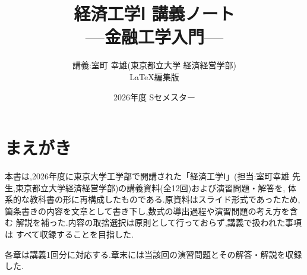 \documentclass[a4paper,11pt,book]{jlreq}
\title{\Huge 経済工学Ⅰ 講義ノート\\[1ex]\Large ---金融工学入門---}
\author{講義:室町 幸雄(東京都立大学 経済経営学部)\\LaTeX編集版}
\date{2026年度 Sセメスター}
\theoremstyle{boxedheadstyle}
\theoremstyle{asideheadstyle}
\begin{document}
\frontmatter
\maketitle

\chapter*{まえがき}
本書は,2026年度に東京大学工学部で開講された「経済工学Ⅰ」(担当:室町幸雄
先生,東京都立大学経済経営学部)の講義資料(全12回)および演習問題・解答を,
体系的な教科書の形に再構成したものである.原資料はスライド形式であったため,
箇条書きの内容を文章として書き下し,数式の導出過程や演習問題の考え方を含む
解説を補った.内容の取捨選択は原則として行っておらず,講義で扱われた事項は
すべて収録することを目指した.

各章は講義1回分に対応する.章末には当該回の演習問題とその解答・解説を収録した.

\tableofcontents

\mainmatter












\end{document}
